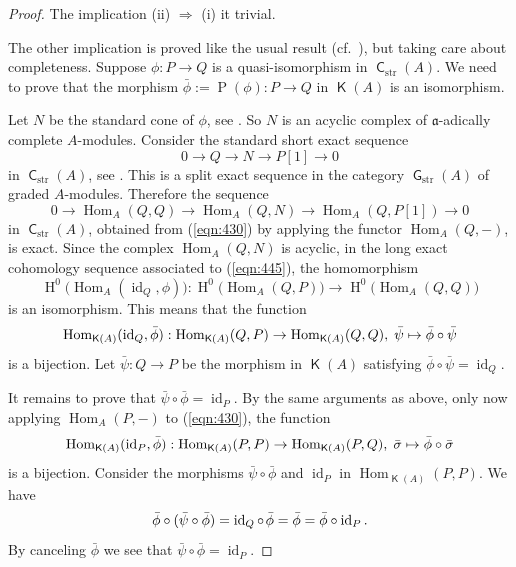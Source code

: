 \documentclass[10pt]{amsart}
\theoremstyle{definition}
\numberwithin{equation}{section}
\newcommand{\opn}{\operatorname}
\newcommand{\cat}[1]{\operatorname{\mathsf{#1}}}
\newcommand{\mfrak}[1]{\mathfrak{#1}}
\newcommand{\mrm}[1]{\mathrm{#1}}
\newcommand{\si}{\sigma}
\renewcommand{\a}{\mfrak{a}}
\newcommand{\msp}[1]{\mspace{#1 mu}}
\begin{document}
\begin{proof}
The implication (ii) $\Rightarrow$ (i) it trivial.

The other implication is proved like the usual result
(cf.\ \cite[Corollary 10.2.14]{Ye3}), but taking care about completeness.
Suppose $\phi : P \to Q$ is a quasi-isomorphism in $\cat{C}_{\mrm{str}}(A)$.
We need to prove that the morphism
$\bar{\phi} := \opn{P}(\phi) : P \to Q$ in $\cat{K}(A)$ is an isomorphism.

Let $N$ be the standard cone of $\phi$, see \cite[Section 4.2]{Ye3}.
So $N$ is an acyclic complex of $\a$-adically complete $A$-modules.
Consider the standard short exact sequence
\begin{equation} \label{eqn:430}
 0 \to Q \to N \to P[1] \to 0
\end{equation}
in $\cat{C}_{\mrm{str}}(A)$,
see \cite[Section 4.2]{Ye5}.
This is a split exact sequence in the category $\cat{G}_{\mrm{str}}(A)$ of
graded $A$-modules.
Therefore the sequence
\begin{equation} \label{eqn:445}
0 \to \opn{Hom}_{A}(Q, Q) \to \opn{Hom}_{A}(Q, N) \to
\opn{Hom}_{A}(Q, P[1]) \to 0
\end{equation}
in $\cat{C}_{\mrm{str}}(A)$, obtained from (\ref{eqn:430}) by
applying the functor $\opn{Hom}_{A}(Q, -)$, is exact.
Since the complex $\opn{Hom}_{A}(Q, N)$ is acyclic, in the
long exact cohomology sequence associated to (\ref{eqn:445}),
the homomorphism
\[ \opn{H}^0 \bigl( \opn{Hom}_{A}(\opn{id}_{Q}, \phi) \bigr) :
\opn{H}^0 \bigl( \opn{Hom}_{A}(Q, P) \bigr) \to
\opn{H}^0 \bigl( \opn{Hom}_{A}(Q, Q) \bigr) \]
is an isomorphism. This means that the function
\[ \opn{Hom}_{\cat{K}(A)}(\opn{id}_{Q}, \bar{\phi}) :
\opn{Hom}_{\cat{K}(A)}(Q, P) \to \opn{Hom}_{\cat{K}(A)}(Q, Q) , \msp{5}
\bar{\psi} \mapsto \bar{\phi} \circ \bar{\psi} \]
is a bijection. Let
$\bar{\psi} : Q \to P$ be the morphism in $\cat{K}(A)$ satisfying
$\bar{\phi} \circ \bar{\psi} = \opn{id}_{Q}$.

It remains to prove that
$\bar{\psi} \circ \bar{\phi} = \opn{id}_{P}$.
By the same arguments as above, only now applying
$\opn{Hom}_{A}(P, -)$ to (\ref{eqn:430}), the function
\[ \opn{Hom}_{\cat{K}(A)}(\opn{id}_{P}, \bar{\phi}) :
\opn{Hom}_{\cat{K}(A)}(P, P) \to \opn{Hom}_{\cat{K}(A)}(P, Q)  , \msp{5}
\bar{\si} \mapsto \bar{\phi} \circ \bar{\si} \]
is a bijection.
Consider the morphisms $\bar{\psi} \circ \bar{\phi}$ and $\opn{id}_{P}$
in $\opn{Hom}_{\cat{K}(A)}(P, P)$. We have
\[ \bar{\phi} \circ (\bar{\psi} \circ \bar{\phi}) =
\opn{id}_{Q} \circ \msp{2} \bar{\phi} = \bar{\phi} =
\bar{\phi} \circ \opn{id}_{P} . \]
By canceling $\bar{\phi}$ we see that
$\bar{\psi} \circ \bar{\phi} = \opn{id}_{P}$.
\end{proof}
\end{document}
